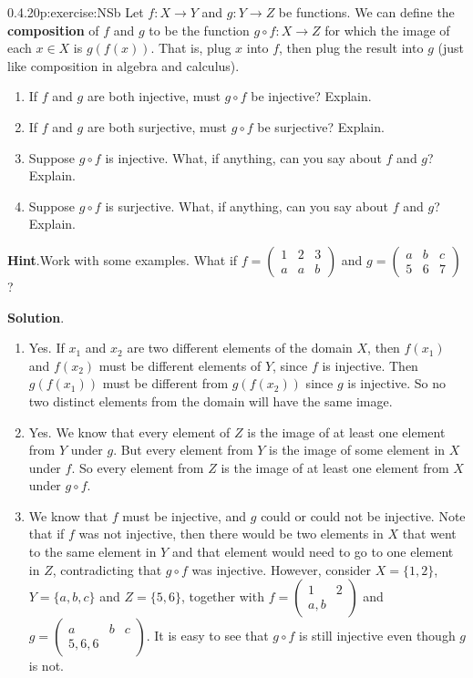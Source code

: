 \documentclass[twoside,11pt,]{book}
\newcommand{\blocktitlefont}{\relax}
\newcommand{\terminology}[1]{\textbf{#1}}
\numberwithin{equation}{chapter}
\newcommand{\twoline}[2]{\begin{pmatrix}#1 \\ #2 \end{pmatrix}}
\newcommand{\amp}{&}
\begin{document}
\begin{divisionsolution}{0.4.20}{}{p:exercise:NSb}%
Let \(f:X \to Y\) and \(g:Y \to Z\) be functions. We can define the \terminology{composition}  of \(f\) and \(g\) to be the function \(g\circ f:X \to Z\) for which the image of each \(x \in X\) is \(g(f(x))\). That is, plug \(x\) into \(f\), then plug the result into \(g\) (just like composition in algebra and calculus).%
\begin{enumerate}[label=(\alph*)]
\item{}If \(f\) and \(g\) are both injective, must \(g\circ f\) be injective? Explain.%
\item{}If \(f\) and \(g\) are both surjective, must \(g\circ f\) be surjective? Explain.%
\item{}Suppose \(g\circ f\) is injective. What, if anything, can you say about \(f\) and \(g\)? Explain.%
\item{}Suppose \(g\circ f\) is surjective. What, if anything, can you say about \(f\) and \(g\)? Explain.%
\end{enumerate}
%
\par\smallskip%
\noindent\textbf{\blocktitlefont Hint}.\quad{}Work with some examples. What if \(f = \twoline{1\amp 2 \amp 3}{a \amp a \amp b}\) and \(g = \twoline{a\amp b \amp c}{5 \amp 6 \amp 7}\)?%
\par\smallskip%
\noindent\textbf{\blocktitlefont Solution}.\quad{}%
\begin{enumerate}[label=(\alph*)]
\item{}Yes. If \(x_1\) and \(x_2\) are two different elements of the domain \(X\), then \(f(x_1)\) and \(f(x_2)\) must be different elements of \(Y\), since \(f\) is injective. Then \(g(f(x_1))\) must be different from \(g(f(x_2))\) since \(g\) is injective. So no two distinct elements from the domain will have the same image.%
\item{}Yes. We know that every element of \(Z\) is the image of at least one element from \(Y\) under \(g\). But every element from \(Y\) is the image of some element in \(X\) under \(f\). So every element from \(Z\) is the image of at least one element from \(X\) under \(g\circ f\).%
\item{}We know that \(f\) must be injective, and \(g\) could or could not be injective. Note that if \(f\) was not injective, then there would be two elements in \(X\) that went to the same element in \(Y\) and that element would need to go to one element in \(Z\), contradicting that \(g\circ f\) was injective. However, consider \(X = \{1,2\}\), \(Y = \{a, b, c\}\) and \(Z = \{5, 6\}\), together with \(f = \twoline{1 \amp 2}{a, b}\) and \(g = \twoline{a \amp b \amp c}{5, 6, 6}\). It is easy to see that \(g \circ f\) is still injective even though \(g\) is not.%

\end{enumerate}
\end{divisionsolution}
\end{document}
